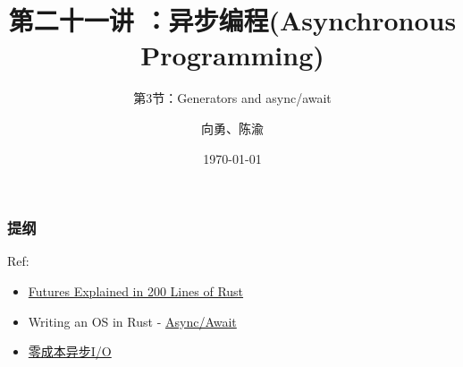 


\title[第21讲]{第二十一讲 ：异步编程(Asynchronous Programming)} %
\subtitle{第3节：Generators and async/await}
\author{向勇、陈渝} %
\date{\today} %



\begin{frame}
\titlepage %
\end{frame}

\begin{frame}
\frametitle{提纲} %
\tableofcontents %
Ref:
    \begin{itemize}
        \item \href{https://cfsamson.github.io/books-futures-explained/}{Futures Explained in 200 Lines of Rust}
        \item Writing an OS in Rust - \href{https://os.phil-opp.com/async-await/}{Async/Await}
        \item \href{https://zhuanlan.zhihu.com/p/97574385}{零成本异步I/O}
    \end{itemize}

\end{frame}
% 
% 
